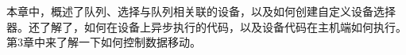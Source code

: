 本章中，概述了队列、选择与队列相关联的设备，以及如何创建自定义设备选择器。还了解了，如何在设备上异步执行的代码，以及设备代码在主机端如何执行。第3章中来了解一下如何控制数据移动。\par

\newpage